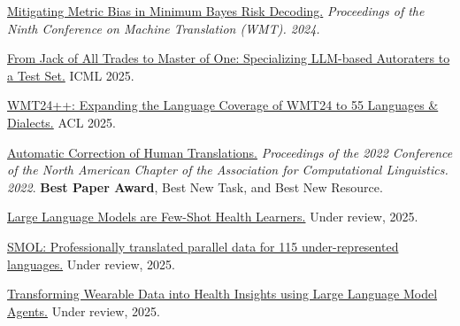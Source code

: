 
\href{https://aclanthology.org/2024.wmt-1.109.pdf}{Mitigating Metric Bias in Minimum Bayes Risk Decoding.} \emph{Proceedings of the Ninth Conference on Machine Translation (WMT). 2024.}

\href{https://arxiv.org/pdf/2411.15387}{From Jack of All Trades to Master of One: Specializing LLM-based Autoraters to a Test Set.} ICML 2025.

\href{https://arxiv.org/pdf/2502.12404}{WMT24++: Expanding the Language Coverage of WMT24 to 55 Languages \& Dialects.} ACL 2025.

\href{https://aclanthology.org/2022.naacl-main.36.pdf}{Automatic Correction of Human Translations.} \emph{Proceedings of the 2022 Conference of the North American Chapter of the Association for Computational Linguistics. 2022}. \textbf{Best Paper Award}, Best New Task, and Best New Resource. %

\href{https://arxiv.org/pdf/2305.15525}{Large Language Models are Few-Shot Health Learners.} Under review, 2025.

\href{https://arxiv.org/pdf/2502.12301}{SMOL: Professionally translated parallel data for 115 under-represented languages.} Under review, 2025.

\href{https://arxiv.org/pdf/2406.06464}{Transforming Wearable Data into Health Insights using Large Language Model Agents.} Under review, 2025.

